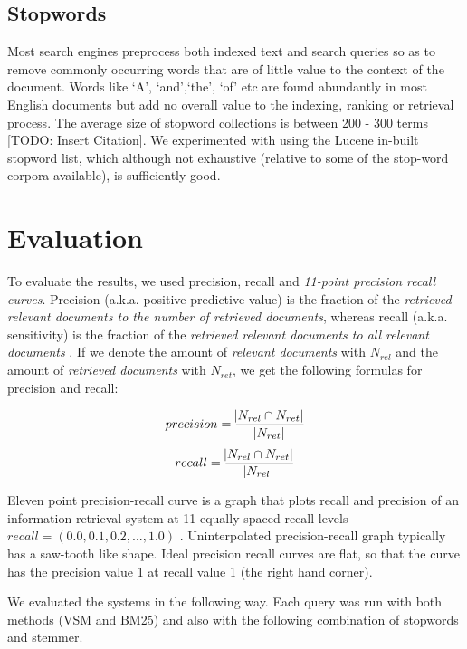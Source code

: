 \subsection{Stopwords}

Most search engines preprocess both indexed text and search queries so as to remove commonly occurring words that are of little value to the context of the document. Words like \lq A', \lq and',\lq the', \lq of' etc are found abundantly in most English documents but add no overall value to the indexing, ranking or retrieval process. The average size of stopword collections is between 200 - 300 terms [TODO: Insert Citation]. We experimented with using the Lucene in-built stopword list, which although not exhaustive (relative to some of the stop-word corpora available), is sufficiently good. 

\section{Evaluation}

To evaluate the results, we used precision, recall and \textit{11-point precision recall curves}. Precision (a.k.a. positive predictive value) is the fraction of the \textit{retrieved relevant documents to the number of retrieved documents}, whereas recall (a.k.a. sensitivity) is the fraction of the \textit{retrieved relevant documents to all relevant documents} \citep{buckland1994relationship}. If we denote the amount of \textit{relevant documents} with $N_{rel}$ and the amount of \textit{retrieved documents} with $ N_{ret} $, we get the following formulas for precision and recall:

\begin{equation}
precision = \frac{ \abs{ N_{rel} \cap N_{ret} } }{\abs{N_{ret}}}
\end{equation}
\begin{equation}
recall = \frac{ \abs{N_{rel} \cap N_{ret} } }{\abs{N_{rel}}}
\end{equation}

Eleven point precision-recall curve is a graph that plots recall and precision of an information retrieval system at 11 equally spaced recall levels $recall = (0.0, 0.1, 0.2,..., 1.0)$ \citep{zhang2009eleven}. Uninterpolated precision-recall graph typically has a saw-tooth like shape. Ideal precision recall curves are flat, so that the curve has the precision value 1 at recall value 1 (the right hand corner). 

We evaluated the systems in the following way. Each query was run with both methods (VSM and BM25) and also with the following combination of stopwords and stemmer.

